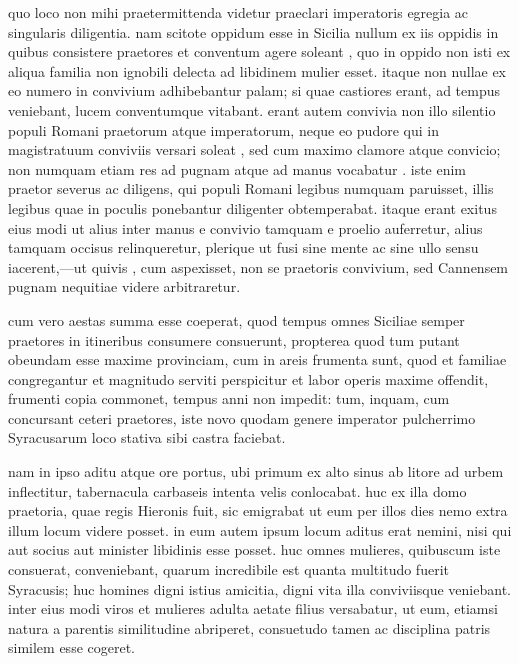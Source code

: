  quo loco non mihi praetermittenda videtur praeclari imperatoris egregia ac singularis diligentia. nam scitote oppidum esse in Sicilia nullum ex iis oppidis in quibus consistere praetores et conventum agere soleant , quo in oppido non isti ex aliqua familia non ignobili delecta ad libidinem mulier esset. itaque non nullae ex eo numero in convivium adhibebantur palam; si quae castiores erant, ad tempus veniebant, lucem conventumque vitabant. erant autem convivia non illo silentio populi Romani praetorum atque imperatorum, neque eo pudore qui in magistratuum conviviis versari soleat , sed cum maximo clamore atque convicio; non numquam etiam res ad pugnam atque ad manus vocabatur . iste enim praetor severus ac diligens, qui populi Romani legibus numquam paruisset, illis legibus quae in poculis ponebantur diligenter obtemperabat. itaque erant exitus eius modi ut alius inter manus e convivio tamquam e proelio auferretur, alius tamquam occisus relinqueretur, plerique ut fusi sine mente ac sine ullo sensu iacerent,—ut quivis , cum aspexisset, non se praetoris convivium, sed Cannensem pugnam nequitiae videre arbitraretur.

 cum vero aestas summa esse coeperat, quod tempus omnes Siciliae semper praetores in itineribus consumere consuerunt, propterea quod tum putant obeundam esse maxime provinciam, cum in areis frumenta sunt, quod et familiae congregantur et magnitudo serviti perspicitur et labor operis maxime offendit, frumenti copia commonet, tempus anni non impedit: tum, inquam, cum concursant ceteri praetores, iste novo quodam genere imperator pulcherrimo Syracusarum loco stativa sibi castra faciebat.

 nam in ipso aditu atque ore portus, ubi primum ex alto sinus ab litore ad urbem inflectitur, tabernacula carbaseis intenta velis conlocabat. huc ex illa domo praetoria, quae regis Hieronis fuit, sic emigrabat ut eum per illos dies nemo extra illum locum videre posset. in eum autem ipsum locum aditus erat nemini, nisi qui aut socius aut minister libidinis esse posset. huc omnes mulieres, quibuscum iste consuerat, conveniebant, quarum incredibile est quanta multitudo fuerit Syracusis; huc homines digni istius amicitia, digni vita illa conviviisque veniebant. inter eius modi viros et mulieres adulta aetate filius versabatur, ut eum, etiamsi natura a parentis similitudine abriperet, consuetudo tamen ac disciplina patris similem esse cogeret.

